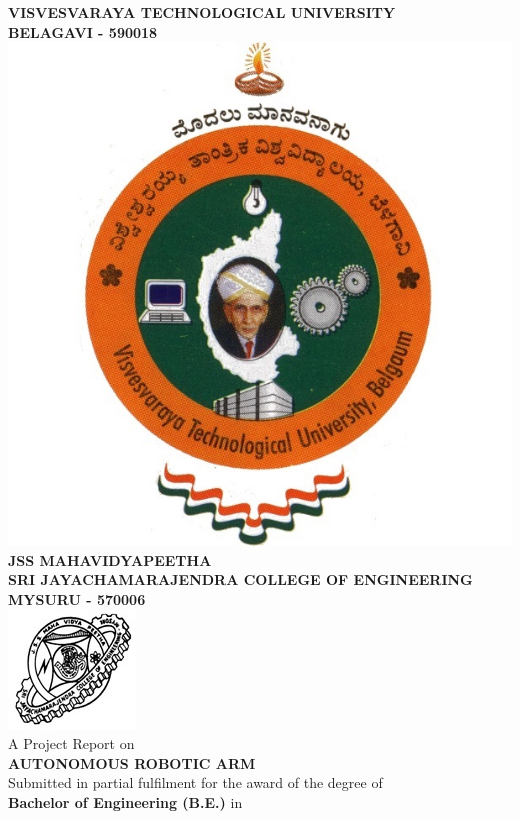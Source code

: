 \newpage
\begin{center}
\thispagestyle{empty}
\Large{\textbf{VISVESVARAYA TECHNOLOGICAL UNIVERSITY}}\\
\large{\textbf{BELAGAVI - 590018}}\\[0.5cm]
\includegraphics[scale=0.25]{vtu}\\
\Large{\textbf{JSS MAHAVIDYAPEETHA}}\\
\vspace{0.5cm}
\Large{\textbf{SRI JAYACHAMARAJENDRA COLLEGE OF ENGINEERING}} \\ 
\large{\textbf{MYSURU - 570006}}\\[0.5cm]
\includegraphics[scale=0.9]{sjce}\\
\large{A Project Report on}\\
\Large{\textsc{\textbf{AUTONOMOUS ROBOTIC ARM}}}\\[0.5cm]
\large{Submitted in partial fulfilment for the award of the degree of\\
\textbf{Bachelor of Engineering (B.E.)} in\\
}
\end{center}
